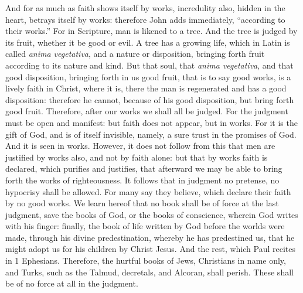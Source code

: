 And for as much as faith shows itself by works, incredulity also, hidden in the heart, betrays itself by works: therefore John adds immediately, “according to their works.” For in Scripture, man is likened to a tree. And the tree is judged by its fruit, whether it be good or evil. A tree has a growing life, which in Latin is called \textit{anima vegetativa}, and a nature or disposition, bringing forth fruit according to its nature and kind. But that soul, that \textit{anima vegetativa}, and that good disposition, bringing forth in us good fruit, that is to say good works, is a lively faith in Christ, where it is, there the man is regenerated and has a good disposition: therefore he cannot, because of his good disposition, but bring forth good fruit. Therefore, after our works we shall all be judged. For the judgment must be open and manifest: but faith does not appear, but in works. For it is the gift of God, and is of itself invisible, namely, a sure trust in the promises of God. And it is seen in works. However, it does not follow from this that men are justified by works also, and not by faith alone: but that by works faith is declared, which purifies and justifies, that afterward we may be able to bring forth the works of righteousness. It follows that in judgment no pretense, no hypocrisy shall be allowed. For many say they believe, which declare their faith by no good works. We learn hereof that no book shall be of force at the last judgment, save the books of God, or the books of conscience, wherein God writes with his finger: finally, the book of life written by God before the worlds were made, through his divine predestination, whereby he has predestined us, that he might adopt us for his children by Christ Jesus. And the rest, which Paul recites in 1 Ephesians. Therefore, the hurtful books of Jews, Christians in name only, and Turks, such as the Talmud, decretals, and Alcoran, shall perish. These shall be of no force at all in the judgment.

